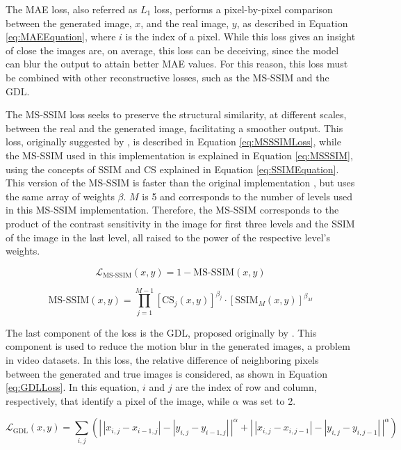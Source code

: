 The MAE loss, also referred as $L_{1}$ loss, performs a pixel-by-pixel comparison between the generated image, $x$, and the real image, $y$, as described in Equation \ref{eq:MAEEquation}, where $i$ is the index of a pixel. While this loss gives an insight of close the images are, on average, this loss can be deceiving, since the model can blur the output to attain better MAE values. For this reason, this loss must be combined with other reconstructive losses, such as the MS-SSIM and the GDL.
\par
The MS-SSIM loss seeks to preserve the structural similarity, at different scales, between the real and the generated image, facilitating a smoother output. This loss, originally suggested by \textcite{Wang2003}, is described in Equation \ref{eq:MSSSIMLoss}, while the MS-SSIM used in this implementation is explained in Equation \ref{eq:MSSSIM}, using the concepts of SSIM and CS explained in Equation \ref{eq:SSIMEquation}. This version of the MS-SSIM is faster than the original implementation \parencite{Wang2003}, but uses the same array of weights $\beta$. $M$ is 5 and corresponds to the number of levels used in this MS-SSIM implementation. Therefore, the MS-SSIM corresponds to the product of the contrast sensitivity in the image for first three levels and the SSIM of the image in the last level, all raised to the power of the respective level's weights.

\begin{equation}
	\mathcal{L}_{\text{MS-SSIM}} (x, y) = 1 - \text{MS-SSIM}(x, y)
	\label{eq:MSSSIMLoss}
\end{equation}

\begin{equation}
	\text{MS-SSIM}(x, y) = \prod_{j=1}^{M-1} \left[ \text{CS}_j(x, y) \right]^{\beta_j} \cdot \left[ \text{SSIM}_M(x, y) \right]^{\beta_M}
	\label{eq:MSSSIM}
\end{equation}

The last component of the loss is the GDL, proposed originally by \textcite{Mathieu2016}. This component is used to reduce the motion blur in the generated images, a problem in video datasets. In this loss, the relative difference of neighboring pixels between the generated and true images is considered, as shown in Equation \ref{eq:GDLLoss}. In this equation, $i$ and $j$ are the index of row and column, respectively, that identify a pixel of the image, while $\alpha$ was set to 2.

\begin{equation}
	\mathcal{L}_{\text{GDL}}(x, y) = \sum_{i,j} \left( \left|\,|x_{i,j} - x_{i-1,j}| - |y_{i,j} - y_{i-1,j}|\,\right|^{\alpha} + \left|\,|x_{i,j} - x_{i,j-1}| - |y_{i,j} - y_{i,j-1}|\,\right|^{\alpha} \right)
	\label{eq:GDLLoss}
\end{equation}

